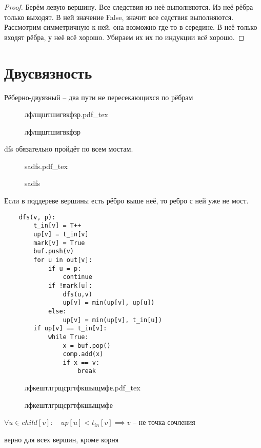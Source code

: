 \documentclass{book}
\theoremstyle{definition}
\newcommand{\incfig}[1]{%
    \def\svgwidth{\columnwidth}
    {#1.pdf_tex}
}
\begin{document}
\begin{proof}
    Берём левую вершину. Все следствия из неё выполняются. Из неё рёбра только выходят. В ней значение False, значит все седствия выполняются. Рассмотрим симметричную к ней, она возможно где-то в середине. В неё только входят рёбра, у неё всё хорошо. Убираем их их по индукции всё хорошо.
\end{proof}

\section{Двусвязность}

Рёберно-двуязный -- два пути не пересекающихся по рёбрам

\begin{figure}[!ht]
    \centering
    \incfig{лфлщштшигвкфзр}
    \caption{лфлщштшигвкфзр}
    \label{fig:лфлщштшигвкфзр}
\end{figure}

\begin{statement}
    dfs обязательно пройдёт по всем мостам.
\end{statement}

\begin{figure}[!ht]
    \centering
    \incfig{sadfs}
    \caption{sadfs}
    \label{fig:sadfs}
\end{figure}

Если в поддереве вершины есть рёбро выше неё, то ребро с ней уже не мост.

\begin{lstlisting}
    dfs(v, p):
        t_in[v] = T++
        up[v] = t_in[v]
        mark[v] = True
        buf.push(v)
        for u in out[v]:
            if u = p:
                continue
            if !mark[u]:
                dfs(u,v)
                up[v] = min(up[v], up[u])
            else:
                up[v] = min(up[v], t_in[u])
        if up[v] == t_in[v]:
            while True:
                x = buf.pop()
                comp.add(x)
                if x == v:
                    break
\end{lstlisting}

\begin{figure}[!ht]
    \centering
    \incfig{лфкештлгрщсргтфкшыщмфе}
    \caption{лфкештлгрщсргтфкшыщмфе}
    \label{fig:лфкештлгрщсргтфкшыщмфе}
\end{figure}

\begin{statement}
    $\forall u\in child[v]:\quad up[u] < t_{in}[v] \implies v$ -- не точка сочления

    верно для всех вершин, кроме корня
\end{statement}
\end{document}
